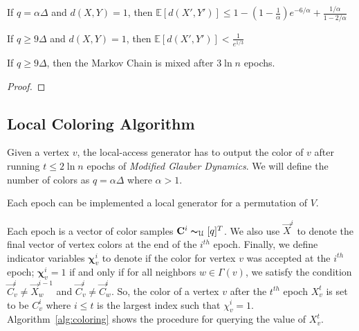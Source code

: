 \begin{lemma}
\label{lem:mohsen_single_epoch_distance}
If $q = \alpha\Delta$ and $d(X, Y) = 1$, then $\mathbb E[d(X',Y')] \le 1-\left( 1-\frac1\alpha\right)e^{-6/\alpha} + \frac{1/\alpha}{1-2/\alpha}$
\end{lemma}
\begin{corollary}
\label{cor:single_epoch_distansce}
If $q \ge 9\Delta$ and $d(X, Y) = 1$, then $\mathbb E[d(X',Y')] < \frac1{e^{1/3}}$
\end{corollary}

\begin{theorem}
\label{thm:modified_mixing_time}
If $q\ge 9\Delta$, then the Markov Chain is mixed after $3\ln n$ epochs.
\end{theorem}
\begin{proof}
\end{proof}




\subsection{Local Coloring Algorithm}%
\label{sub:local_coloring_algortihm}
Given a vertex $v$, the local-access generator has to output the color of $v$ after running $t \le 2\ln n$ epochs of \emph{Modified Glauber Dynamics}.
We will define the number of colors as $q = \alpha\Delta$ where $\alpha > 1$.

Each epoch can be implemented a local generator for a permutation of $V$.


Each epoch is a vector of color samples $\vec C^{i} \thicksim_{\mathcal U} [q]^T$.
We also use $\vec X^i$ to denote the final vector of vertex colors at the end of the $i^{th}$ epoch.
Finally, we define indicator variables $\bm \chi^i_v$ to denote if the color for vertex $v$ was accepted at the $i^{th}$ epoch;
$\bm \chi^i_v = 1$ if and only if for all neighbors $w\in \Gamma(v)$,
we satisfy the condition $\vec  C^i_v\not= \vec X^{i-1}_w$ and $\vec C^i_v\not= \vec C^i_w$.
So, the color of a vertex $v$ after the $t^{th}$ epoch $X^t_v$ is set to be $C^i_v$
where $i\le t$ is the largest index such that $\chi^i_v=1$.
Algorithm~\ref{alg:coloring} shows the procedure for querying the value of $X^t_v$.

